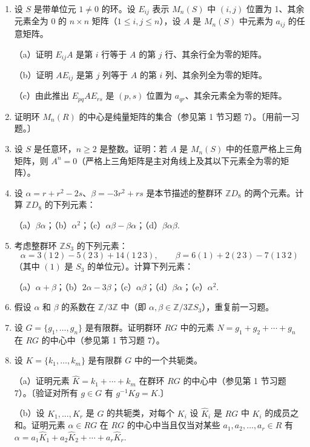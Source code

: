 \begin{enumerate}
（b）定义映射
\[
v : F((x))^\times \to \mathbb{Z}, \quad v\left(\sum_{n \geq N} a_nx^n\right) = N,
\]
其中 \(a_N\) 是级数的第一个非零系数（即 \(N\) 是“级数在 0 处的零点或极点的阶”）。证明 \(v\) 是 \(F((x))\) 上的离散赋值，其离散赋值环是形式幂级数环 \(F[[x]]\)（参见第 1 节习题 26）。

\item 设 \(S\) 是带单位元 \(1 \neq 0\) 的环。设 \(E_{ij}\) 表示 \(M_n(S)\) 中 \((i, j)\) 位置为 1、其余元素全为 0 的 \(n \times n\) 矩阵（\(1 \leq i, j \leq n\)），设 \(A\) 是 \(M_n(S)\) 中元素为 \(a_{ij}\) 的任意矩阵。

（a）证明 \(E_{ij}A\) 是第 \(i\) 行等于 \(A\) 的第 \(j\) 行、其余行全为零的矩阵。

（b）证明 \(AE_{ij}\) 是第 \(j\) 列等于 \(A\) 的第 \(i\) 列、其余列全为零的矩阵。

（c）由此推出 \(E_{pq}AE_{rs}\) 是 \((p, s)\) 位置为 \(a_{qr}\)、其余元素全为零的矩阵。

\item 证明环 \(M_n(R)\) 的中心是纯量矩阵的集合（参见第 1 节习题 7）。〔用前一习题。〕

\item 设 \(S\) 是任意环，\(n \geq 2\) 是整数。证明：若 \(A\) 是 \(M_n(S)\) 中的任意严格上三角矩阵，则 \(A^n = 0\)（严格上三角矩阵是主对角线上及其以下元素全为零的矩阵）。

\item 设 \(\alpha = r + r^2 - 2s\)、\(\beta = -3r^2 + rs\) 是本节描述的整群环 \(\mathbb{Z}D_8\) 的两个元素。计算 \(\mathbb{Z}D_8\) 的下列元素：

（a）\(\beta\alpha\)；（b）\(\alpha^2\)；（c）\(\alpha\beta - \beta\alpha\)；（d）\(\beta\alpha\beta\).

\item 考虑整群环 \(\mathbb{Z}S_3\) 的下列元素：
\[
\alpha = 3(1\,2) - 5(2\,3) + 14(1\,2\,3), \qquad \beta = 6(1) + 2(2\,3) - 7(1\,3\,2)
\]
（其中 \((1)\) 是 \(S_3\) 的单位元）。计算下列元素：

（a）\(\alpha+\beta\)；（b）\(2\alpha - 3\beta\)；（c）\(\alpha\beta\)；（d）\(\beta\alpha\)；（e）\(\alpha^2\).

\item 假设 \(\alpha\) 和 \(\beta\) 的系数在 \(\mathbb{Z}/3\mathbb{Z}\) 中（即 \(\alpha, \beta \in \mathbb{Z}/3\mathbb{Z}S_3\)），重复前一习题。

\item 设 \(G = \{g_1, \ldots, g_n\}\) 是有限群。证明群环 \(RG\) 中的元素 \(N = g_1 + g_2 + \cdots + g_n\) 在 \(RG\) 的中心中（参见第 1 节习题 7）。

\item 设 \(K = \{k_1, \ldots, k_m\}\) 是有限群 \(G\) 中的一个共轭类。

（a）证明元素 \(\hat{K} = k_1 + \cdots + k_m\) 在群环 \(RG\) 的中心中（参见第 1 节习题 7）。〔验证对所有 \(g \in G\) 有 \(g^{-1}Kg = K\).〕

（b）设 \(K_1, \ldots, K_r\) 是 \(G\) 的共轭类，对每个 \(K_i\) 设 \(\hat{K}_i\) 是 \(RG\) 中 \(K_i\) 的成员之和。证明元素 \(\alpha \in RG\) 在 \(RG\) 的中心中当且仅当对某些 \(a_1, a_2, \ldots, a_r \in R\) 有 \(\alpha = a_1\hat{K}_1 + a_2\hat{K}_2 + \cdots + a_r\hat{K}_r\).
\end{enumerate}

